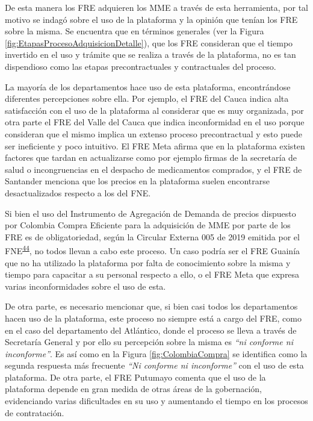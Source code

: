 \documentclass[
  oneside]{book}
\begin{document}
De esta manera los FRE adquieren los MME a través de esta herramienta, por tal motivo se indagó sobre el uso de la plataforma y la opinión que tenían los FRE sobre la misma. Se encuentra que en términos generales (ver la Figura \ref{fig:EtapasProcesoAdquisicionDetalle}), que los FRE consideran que el tiempo invertido en el uso y trámite que se realiza a través de la plataforma, no es tan dispendioso como las etapas precontractuales y contractuales del proceso.

La mayoría de los departamentos hace uso de esta plataforma, encontrándose diferentes percepciones sobre ella. Por ejemplo, el FRE del Cauca indica alta satisfacción con el uso de la plataforma al considerar que es muy organizada, por otra parte el FRE del Valle del Cauca que indica inconformidad en el uso porque consideran que el mismo implica un extenso proceso precontractual y esto puede ser ineficiente y poco intuitivo. El FRE Meta afirma que en la plataforma existen factores que tardan en actualizarse como por ejemplo firmas de la secretaría de salud o incongruencias en el despacho de medicamentos comprados, y el FRE de Santander menciona que los precios en la plataforma suelen encontrarse desactualizados respecto a los del FNE.

Si bien el uso del Instrumento de Agregación de Demanda de precios dispuesto por Colombia Compra Eficiente para la adquisición de MME por parte de los FRE es de obligatoriedad, según la Circular Externa 005 de 2019 emitida por el FNE\textsuperscript{\protect\hyperlink{ref-FNE005-2019}{44}}, no todos llevan a cabo este proceso. Un caso podría ser el FRE Guainía que no ha utilizado la plataforma por falta de conocimiento sobre la misma y tiempo para capacitar a su personal respecto a ello, o el FRE Meta que expresa varias inconformidades sobre el uso de esta.

De otra parte, es necesario mencionar que, si bien casi todos los departamentos hacen uso de la plataforma, este proceso no siempre está a cargo del FRE, como en el caso del departamento del Atlántico, donde el proceso se lleva a través de Secretaría General y por ello su percepción sobre la misma es \emph{``ni conforme ni inconforme''}. Es así como en la Figura \ref{fig:ColombiaCompra} se identifica como la segunda respuesta más frecuente \emph{``Ni conforme ni inconforme''} con el uso de esta plataforma. De otra parte, el FRE Putumayo comenta que el uso de la plataforma depende en gran medida de otras áreas de la gobernación, evidenciando varias dificultades en su uso y aumentando el tiempo en los procesos de contratación.
\end{document}
